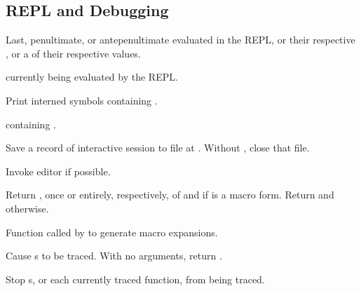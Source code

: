 \subsection[REPL~\&~Debug]{REPL and Debugging} 

\begin{LIST}{1cm}
  
  {
  Last, penultimate, or antepenultimate  evaluated in the REPL, or
  their respective , or a  of their respective
  values. 
  }

  \IT{\V*{--}}
  {
   currently being evaluated by the REPL.
  }

  {
  Print interned symbols containing .
  }

  {
   containing .
  }

  {
  Save a record of interactive session to file at . Without
  , close that file.
  }

  {
  Invoke editor if possible.
  }

  {
  Return , once or entirely, respectively, of
   and \retvalii{\T} if  is a macro form. 
  Return  and \retvalii{\NIL} otherwise.
  }

  {
  Function called by  to generate macro expansions.
  }

  {
  Cause s to be traced. With no arguments,
  return .
  }

  {
  Stop s, or each currently traced function, from being
  traced. 
  }


\end{LIST}
